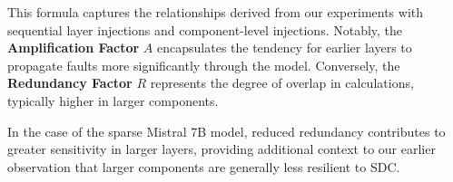 This formula captures the relationships derived from our experiments with sequential layer injections and component-level injections. Notably, the \textbf{Amplification Factor} $A$ encapsulates the tendency for earlier layers to propagate faults more significantly through the model. Conversely, the \textbf{Redundancy Factor} $R$ represents the degree of overlap in calculations, typically higher in larger components.

In the case of the sparse Mistral 7B model, reduced redundancy contributes to greater sensitivity in larger layers, providing additional context to our earlier observation that larger components are generally less resilient to SDC.

